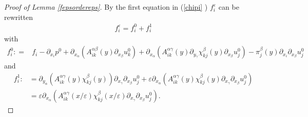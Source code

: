 \documentclass[11pt, reqno]{amsart}
\theoremstyle{definition}
\theoremstyle{remark}
\numberwithin{equation}{section}
\begin{document}
	\begin{proof}[Proof  of \textup{Lemma \ref{fepsordereps}}]
		By the first equation  in (\ref{chipi} )  $f_i^\varepsilon$ can be rewritten
		\begin{align}
			f_i^\varepsilon=f_i^0 + f_i^1 
		\end{align}			
		with	\begin{align*}
			f_i^0:
			=&f_i- \partial_{x_i}  p^0 +\partial_{x_\alpha}\left( A^{\alpha\beta}_{ik}(y)\partial_{x_\beta}	\! u_k^0 \right)+  \partial_{x_\alpha} \left(A^{\alpha\gamma}_{ik}(y)\partial_{y_\gamma}	\chi^{\beta}_{kj}(y)\partial_{ x_{\beta}}  u^0_j \right)-  \pi^{\beta}_{j}(y)\partial_{x_i} \partial_{ x_{\beta}}  u^0_j
		\end{align*} 		
		and 
		\begin{align*}
			f_i^1:&=	\partial_{y_\alpha} \left(A^{\alpha\gamma}_{ik}(y)  \chi^{\beta}_{kj}(y) \right)\partial_{x_\gamma}	\partial_{ x_{\beta}}  u^0_j  +\varepsilon \partial_{x_\alpha}\left(  A^{\alpha\gamma}_{ik} (y) \chi^{\beta}_{kj}(y) \partial_{x_\gamma}	\partial_{ x_{\beta}}  u^0_j \right) \\ &= \varepsilon \partial_{x_\alpha} \left(A^{\alpha\gamma}_{ik} (x/\varepsilon) \chi^{\beta}_{kj}(x/\varepsilon) \partial_{x_\gamma}	\partial_{ x_{\beta}}  u^0_j  \right) .
		\end{align*}
		

\end{proof}
\end{document}
